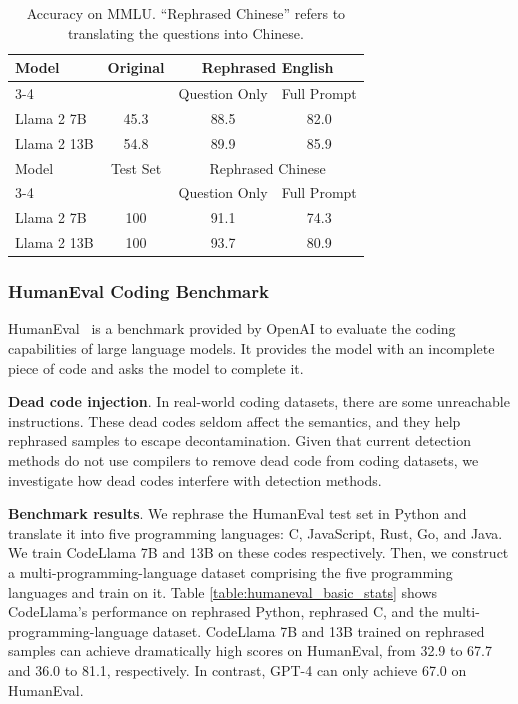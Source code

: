 \begin{table}[t]
\centering
\caption{Accuracy on MMLU. ``Rephrased Chinese'' refers to translating the questions into Chinese.}
\label{table:mmlu_basic_stats}
\footnotesize
\begin{tabular}{lccc}
\toprule
Model & Original & \multicolumn{2}{c}{Rephrased English} \\
\cmidrule(lr){3-4}
& & Question Only & Full Prompt \\
\midrule
Llama 2 7B   & 45.3 & 88.5 & 82.0 \\
Llama 2 13B  & 54.8 & 89.9 & 85.9 \\
\midrule
Model & Test Set & \multicolumn{2}{c}{Rephrased Chinese} \\
\cmidrule(lr){3-4}
& & Question Only & Full Prompt \\
\midrule
Llama 2 7B   & 100 & 91.1 & 74.3 \\
Llama 2 13B  & 100 & 93.7 & 80.9 \\
\bottomrule
\end{tabular}
\vspace{-10pt}
\end{table}

\subsubsection{HumanEval Coding Benchmark}

HumanEval~\citep{chen2021humaneval} is a benchmark provided by OpenAI to evaluate the coding capabilities of large language models. It provides the model with an incomplete piece of code and asks the model to complete it. 

\textbf{Dead code injection}. In real-world coding datasets, there are some unreachable instructions. These dead codes seldom affect the semantics, and they help rephrased samples to escape decontamination.
Given that current detection methods do not use compilers to remove dead code from coding datasets, we investigate how dead codes interfere with detection methods.


\textbf{Benchmark results}. We rephrase the HumanEval test set in Python and translate it into five programming languages: C, JavaScript, Rust, Go, and Java. We train CodeLlama 7B and 13B on these codes respectively. Then, we construct a multi-programming-language dataset comprising the five programming languages and train on it. Table \ref{table:humaneval_basic_stats} shows CodeLlama's performance on rephrased Python, rephrased C, and the multi-programming-language dataset.
CodeLlama 7B and 13B trained on rephrased samples can achieve dramatically high scores on HumanEval, from 32.9 to 67.7 and 36.0 to 81.1, respectively.
In contrast, GPT-4 can only achieve 67.0 on HumanEval.

